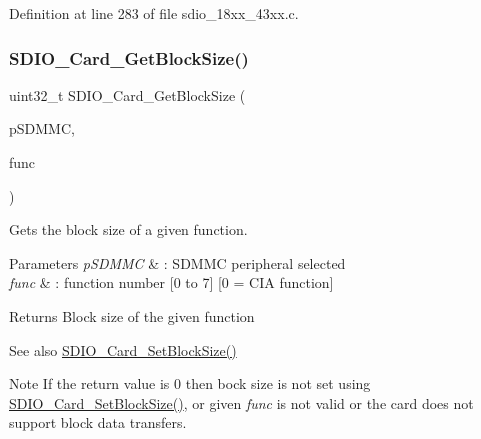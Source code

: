 Definition at line 283 of file sdio\+\_\+18xx\+\_\+43xx.\+c.

\mbox{\label{group___s_d_i_o__18_x_x__43_x_x_gaf6da8cc6d310edac956ffdfce32be97c}} 
\subsubsection{\texorpdfstring{S\+D\+I\+O\+\_\+\+Card\+\_\+\+Get\+Block\+Size()}{SDIO\_Card\_GetBlockSize()}}
{\footnotesize\ttfamily uint32\+\_\+t S\+D\+I\+O\+\_\+\+Card\+\_\+\+Get\+Block\+Size (\begin{DoxyParamCaption}\item[{\hyperlink{struct_l_p_c___s_d_m_m_c___t}{L\+P\+C\+\_\+\+S\+D\+M\+M\+C\+\_\+T} $\ast$}]{p\+S\+D\+M\+MC,  }\item[{uint32\+\_\+t}]{func }\end{DoxyParamCaption})}



Gets the block size of a given function. 


\begin{DoxyParams}{Parameters}
{\em p\+S\+D\+M\+MC} & \+: S\+D\+M\+MC peripheral selected \\
\hline
{\em func} & \+: function number \mbox{[}0 to 7\mbox{]} \mbox{[}0 = C\+IA function\mbox{]} \\
\hline
\end{DoxyParams}
\begin{DoxyReturn}{Returns}
Block size of the given function 
\end{DoxyReturn}
\begin{DoxySeeAlso}{See also}
\hyperlink{group___s_d_i_o__18_x_x__43_x_x_ga5149b1d9ad72df09f19c32d81673b487}{S\+D\+I\+O\+\_\+\+Card\+\_\+\+Set\+Block\+Size()} 
\end{DoxySeeAlso}
\begin{DoxyNote}{Note}
If the return value is 0 then bock size is not set using \hyperlink{group___s_d_i_o__18_x_x__43_x_x_ga5149b1d9ad72df09f19c32d81673b487}{S\+D\+I\+O\+\_\+\+Card\+\_\+\+Set\+Block\+Size()}, or given {\itshape func} is not valid or the card does not support block data transfers. 
\end{DoxyNote}


